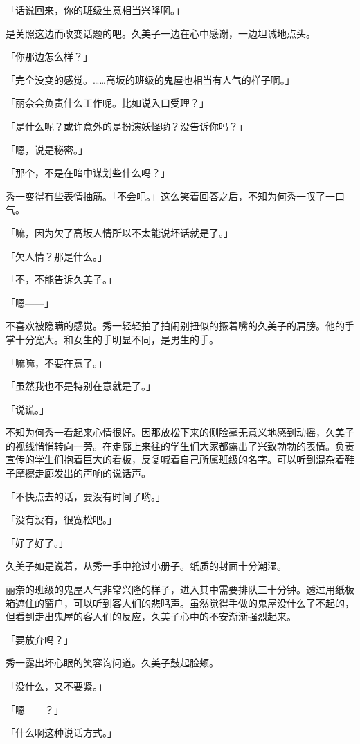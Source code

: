 \documentclass[UTF8]{ctexart}
\begin{document}
    「话说回来，你的班级生意相当兴隆啊。」

    是关照这边而改变话题的吧。久美子一边在心中感谢，一边坦诚地点头。

    「你那边怎么样？」

    「完全没变的感觉。……高坂的班级的鬼屋也相当有人气的样子啊。」

    「丽奈会负责什么工作呢。比如说入口受理？」

    「是什么呢？或许意外的是扮演妖怪哟？没告诉你吗？」

    「嗯，说是秘密。」

    「那个，不是在暗中谋划些什么吗？」

    秀一变得有些表情抽筋。「不会吧。」这么笑着回答之后，不知为何秀一叹了一口气。

    「嘛，因为欠了高坂人情所以不太能说坏话就是了。」

    「欠人情？那是什么。」

    「不，不能告诉久美子。」

    「嗯——」

    不喜欢被隐瞒的感觉。秀一轻轻拍了拍闹别扭似的撅着嘴的久美子的肩膀。他的手掌十分宽大。和女生的手明显不同，是男生的手。

    「嘛嘛，不要在意了。」

    「虽然我也不是特别在意就是了。」

    「说谎。」

    不知为何秀一看起来心情很好。因那放松下来的侧脸毫无意义地感到动摇，久美子的视线悄悄转向一旁。在走廊上来往的学生们大家都露出了兴致勃勃的表情。负责宣传的学生们抱着巨大的看板，反复喊着自己所属班级的名字。可以听到混杂着鞋子摩擦走廊发出的声响的说话声。

    「不快点去的话，要没有时间了哟。」

    「没有没有，很宽松吧。」

    「好了好了。」

    久美子如是说着，从秀一手中抢过小册子。纸质的封面十分潮湿。

    丽奈的班级的鬼屋人气非常兴隆的样子，进入其中需要排队三十分钟。透过用纸板箱遮住的窗户，可以听到客人们的悲鸣声。虽然觉得手做的鬼屋没什么了不起的，但看到走出鬼屋的客人们的反应，久美子心中的不安渐渐强烈起来。

    「要放弃吗？」

    秀一露出坏心眼的笑容询问道。久美子鼓起脸颊。

    「没什么，又不要紧。」

    「嗯——？」

    「什么啊这种说话方式。」
\end{document}
